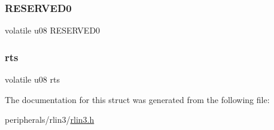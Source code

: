 \mbox{\label{structrlin3__ltrc_a59c0b30ccfb89f1b34e9682741859abd}} 
\subsubsection{\texorpdfstring{R\+E\+S\+E\+R\+V\+E\+D0}{RESERVED0}}
{\footnotesize\ttfamily volatile u08 R\+E\+S\+E\+R\+V\+E\+D0}

\mbox{\label{structrlin3__ltrc_a751ec957e40bc4d328ed203db01c32e2}} 
\subsubsection{\texorpdfstring{rts}{rts}}
{\footnotesize\ttfamily volatile u08 rts}



The documentation for this struct was generated from the following file\+:\begin{DoxyCompactItemize}
\item 
peripherals/rlin3/\mbox{\hyperlink{rlin3_8h}{rlin3.\+h}}\end{DoxyCompactItemize}
